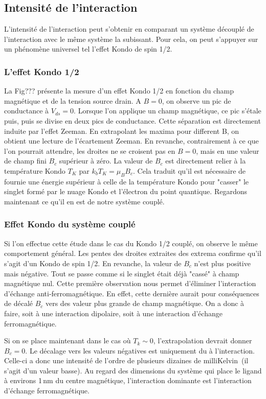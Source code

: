 \subsection{Intensité de l'interaction}
L'intensité de l'interaction peut s'obtenir en comparant un système découplé de l'interaction avec le même système la subissant. Pour cela, on peut s'appuyer sur un phénomène universel tel l'effet Kondo de spin 1/2.

\subsubsection{L'effet Kondo 1/2}
La Fig??? présente la mesure d'un effet Kondo 1/2 en fonction du champ magnétique et de la tension source drain. A $B=0$, on observe un pic de conductance à $V_{ds}=0$. Lorsque l'on applique un champ magnétique, ce pic s'étale puis, puis se divise en deux pics de conductance. Cette séparation est directement induite par l'effet Zeeman. En extrapolant les maxima pour different B, on obtient une lecture de l'écartement Zeeman. En revanche, contrairement à ce que l'on pourrait attendre, les droites ne se croisent pas en $B=0$, mais en une valeur de champ fini $B_c$ supérieur à zéro. La valeur de $B_c$ est directement relier à la température Kondo $T_K$ par $k_bT_K = \mu_B B_c$. Cela traduit qu'il est nécessaire de fournie une énergie supérieur à celle de la température Kondo pour "casser" le singlet formé par le nuage Kondo et l'électron du point quantique. Regardons maintenant ce qu'il en est de notre système couplé.

\subsubsection{Effet Kondo du système couplé}
Si l'on effectue cette étude dans le cas du Kondo 1/2 couplé, on observe le même comportement général. Les pentes des droites extraites des extrema confirme qu'il s'agit d'un Kondo de spin 1/2. En revanche, la valeur de $B_c$ n'est plus positive mais négative. Tout se passe comme si le singlet était déjà "cassé" à champ magnétique nul. Cette première observation nous permet d'éliminer l'interaction d'échange anti-ferromagnétique. En effet, cette dernière aurait pour conséquences de décalé $B_c$ vers des valeur plus grande de champ magnétique. On a donc à faire, soit à une interaction dipolaire, soit à une interaction d'échange ferromagnétique.

Si on se place maintenant dans le cas où $T_k \sim 0$, l'extrapolation devrait donner $B_c=0$. Le décalage vers les valeurs négatives est uniquement du à l'interaction. Celle-ci a donc une intensité de l'ordre de plusieurs dizaines de milliKelvin~(il s'agit d'un valeur basse). Au regard des dimensions du système qui place le ligand à environs 1\,nm du centre magnétique, l'interaction dominante est l'interaction d'échange ferromagnétique.

